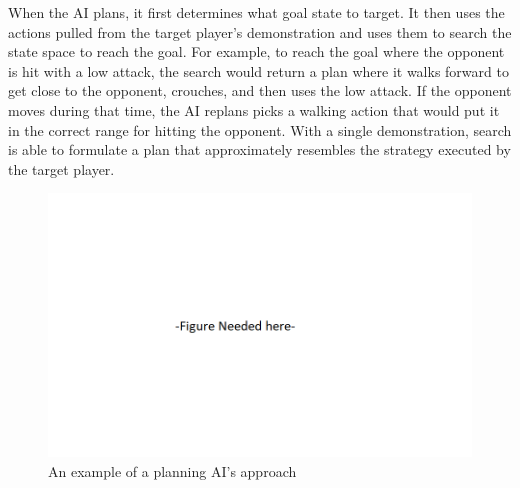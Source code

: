 
When the AI plans, it first determines what goal state to target. It then uses the actions pulled from the target player's demonstration and uses them to search the state space to reach the goal. For example, to reach the goal where the opponent is hit with a low attack, the search would return a plan where it walks forward to get close to the opponent, crouches, and then uses the low attack. If the opponent moves during that time, the AI replans picks a walking action that would put it in the correct range for hitting the opponent. With a single demonstration, search is able to formulate a plan that approximately resembles the strategy executed by the target player.

\begin{figure}[h]
	\centering
	\includegraphics[width=\textwidth]{Figures/Placeholder.png}
	\caption{An example of a planning AI's approach}
	\label{transitions}
\end{figure}
